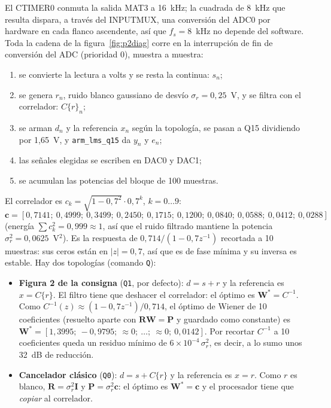 \documentclass[11pt,a4paper]{article}
\newcommand{\lmsq}{\texttt{arm\_lms\_q15}}
\begin{document}
El CTIMER0 conmuta la salida MAT3 a 16~kHz; la cuadrada de 8~kHz que resulta dispara, a través
del INPUTMUX, una conversión del ADC0 por hardware en cada flanco ascendente, así que
$f_s = 8$~kHz no depende del software. Toda la cadena de la figura~\ref{fig:p2diag} corre en la
interrupción de fin de conversión del ADC (prioridad 0), muestra a muestra:
\begin{enumerate}
  \item se convierte la lectura a volts y se resta la continua: $s_n$;
  \item se genera $r_n$, ruido blanco gaussiano de desvío $\sigma_r = 0{,}25$~V, y se filtra con
  el correlador: $C\{r\}_n$;
  \item se arman $d_n$ y la referencia $x_n$ según la topología, se pasan a Q15 dividiendo por
  1,65~V, y \lmsq{} da $y_n$ y $e_n$;
  \item las señales elegidas se escriben en DAC0 y DAC1;
  \item se acumulan las potencias del bloque de 100 muestras.
\end{enumerate}

El correlador es $c_k = \sqrt{1-0{,}7^2}\cdot 0{,}7^k$, $k = 0\dots9$:
\[\mathbf{c} = [0{,}7141;\ 0{,}4999;\ 0{,}3499;\ 0{,}2450;\ 0{,}1715;\ 0{,}1200;\ 0{,}0840;\ 0{,}0588;\ 0{,}0412;\ 0{,}0288]\]
(energía $\sum c_k^2 = 0{,}999 \approx 1$, así que el ruido filtrado mantiene la potencia
$\sigma_r^2 = 0{,}0625$~V$^2$). Es la respuesta de $0{,}714/(1-0{,}7z^{-1})$ recortada a
10 muestras: sus ceros están en $|z| = 0{,}7$, así que es de fase mínima y su inversa es estable.
Hay dos topologías (comando \texttt{Q}):
\begin{itemize}
  \item \textbf{Figura 2 de la consigna} (\texttt{Q1}, por defecto): $d = s + r$ y la
  referencia es $x = C\{r\}$. El filtro tiene que deshacer el correlador: el óptimo es
  $\mathbf{W}^* = C^{-1}$. Como $C^{-1}(z) \approx (1-0{,}7z^{-1})/0{,}714$, el óptimo de Wiener
  de 10 coeficientes (resuelto aparte con $\mathbf{R}\mathbf{W} = \mathbf{P}$ y guardado como
  constante) es
  $\mathbf{W}^* = [1{,}3995;\ -0{,}9795;\ \approx 0;\ \dots;\ \approx 0;\ 0{,}0142]$. Por recortar
  $C^{-1}$ a 10 coeficientes queda un residuo mínimo de $6\times10^{-4}\,\sigma_r^2$, es decir, a
  lo sumo unos 32~dB de reducción.
  \item \textbf{Cancelador clásico} (\texttt{Q0}): $d = s + C\{r\}$ y la referencia es $x = r$.
  Como $r$ es blanco, $\mathbf{R} = \sigma_r^2\mathbf{I}$ y $\mathbf{P} = \sigma_r^2\mathbf{c}$:
  el óptimo es $\mathbf{W}^* = \mathbf{c}$ y el procesador tiene que \emph{copiar} al correlador.
\end{itemize}
\end{document}
